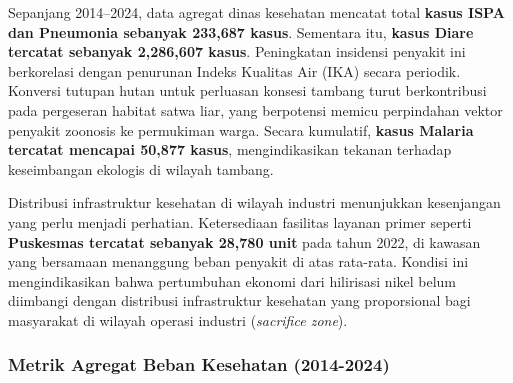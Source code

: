 \documentclass[
]{article}
\begin{document}
Sepanjang 2014--2024, data agregat dinas kesehatan mencatat total
\textbf{kasus ISPA dan Pneumonia sebanyak 233,687 kasus}. Sementara itu,
\textbf{kasus Diare tercatat sebanyak 2,286,607 kasus}. Peningkatan
insidensi penyakit ini berkorelasi dengan penurunan Indeks Kualitas Air
(IKA) secara periodik. Konversi tutupan hutan untuk perluasan konsesi
tambang turut berkontribusi pada pergeseran habitat satwa liar, yang
berpotensi memicu perpindahan vektor penyakit zoonosis ke permukiman
warga. Secara kumulatif, \textbf{kasus Malaria tercatat mencapai 50,877
kasus}, mengindikasikan tekanan terhadap keseimbangan ekologis di
wilayah tambang.

Distribusi infrastruktur kesehatan di wilayah industri menunjukkan
kesenjangan yang perlu menjadi perhatian. Ketersediaan fasilitas layanan
primer seperti \textbf{Puskesmas tercatat sebanyak 28,780 unit} pada
tahun 2022, di kawasan yang bersamaan menanggung beban penyakit di atas
rata-rata. Kondisi ini mengindikasikan bahwa pertumbuhan ekonomi dari
hilirisasi nikel belum diimbangi dengan distribusi infrastruktur
kesehatan yang proporsional bagi masyarakat di wilayah operasi industri
(\emph{sacrifice zone}).

\subsubsection{Metrik Agregat Beban Kesehatan
(2014-2024)}\label{metrik-agregat-beban-kesehatan-2014-2024}
\end{document}

